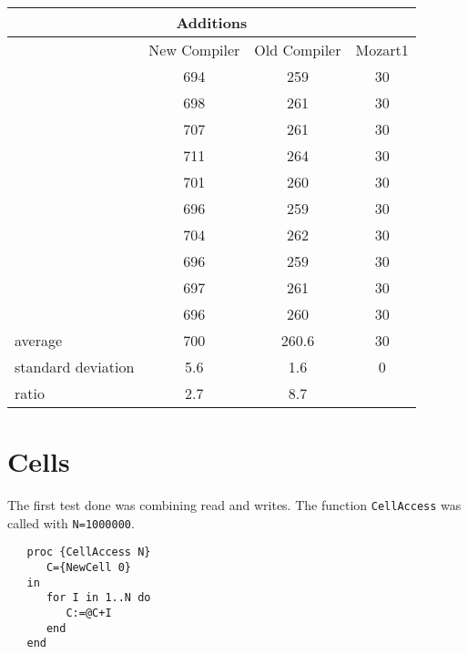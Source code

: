 \documentclass[a4paper]{memoir}
\begin{document}
\begin{appendices}
\begin{center}
\begin{tabular} {| l c c c|}
\hline
\multicolumn{4}{|c|}{\textbf{Additions}} \\ \hline
  & New Compiler& Old Compiler & Mozart1 \\
  &          694& 259& 30 \\
  &          698& 261& 30 \\
  &          707& 261& 30 \\
  &          711& 264& 30 \\
  &          701& 260& 30 \\
  &          696& 259& 30 \\
  &          704& 262& 30 \\
  &          696& 259& 30 \\
  &          697& 261& 30 \\
  &          696& 260& 30 \\ \hline
average& 700& 260.6& 30\\
standard deviation& 5.6         &  1.6         &  0 \\
ratio& 2.7           & 8.7          & \\ 
\hline
\end{tabular}
\end{center}

\section{Cells}

The first test done was combining read and writes. The function
\lstinline!CellAccess! was called with \lstinline!N=1000000!.

\begin{lstlisting}
   proc {CellAccess N}
      C={NewCell 0}
   in
      for I in 1..N do
         C:=@C+I
      end
   end
\end{lstlisting}



\end{appendices}
\end{document}

